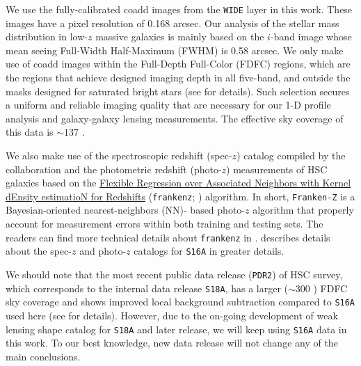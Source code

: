 \documentclass[fleqn,usenatbib,useAMS,english]{mnras}
\begin{document}
    We use the fully-calibrated coadd images from the \texttt{WIDE} layer in this work.
    These images have a pixel resolution of 0.168 arcsec.
    Our analysis of the stellar mass distribution in low-$z$ massive galaxies is mainly based on
    the $i$-band image whose mean seeing Full-Width Half-Maximum (FWHM) is 0.58 arcsec.
    We only make use of coadd images within the Full-Depth Full-Color (FDFC) regions, which
    are the regions that achieve designed imaging depth in all five-band, and outside the masks
    designed for saturated bright stars (see \citealt{HSC-STAR} for details).
    Such selection secures a uniform and reliable imaging quality that are necessary for
    our 1-D profile analysis and galaxy-galaxy lensing measurements.
    The effective sky coverage of this data is $\sim 137$ \sqdeg{}.

    We also make use of the spectroscopic redshift (spec-$z$) catalog compiled by the collaboration
    and the photometric redshift (photo-$z$) measurements of HSC galaxies based on the
    \href{https://github.com/joshspeagle/frankenz}{Flexible Regression over Associated Neighbors
    with Kernel dEnsity estimatioN for Redshifts} (\texttt{frankenz}; \citealt{Speagle2019})
    algorithm.
    In short, \texttt{Franken-Z} is a Bayesian-oriented nearest-neighbors (NN)- based photo-$z$
    algorithm that properly account for measurement errors within both training and testing sets.
    The readers can find more technical details about \texttt{frankenz} in \citet{Speagle2019}.
    \citet{HSC-PHOTOZ} describes details about the spec-$z$ and photo-$z$ catalogs for \texttt{S16A}
    in greater details.

    We should note that the most recent public data release (\texttt{PDR2}) of HSC survey, which
    corresponds to the internal data release \texttt{S18A}, has a larger ($\sim 300$ \sqdeg{}) FDFC
    sky coverage and shows improved local background subtraction compared to \texttt{S16A} used here
    (see \citealt{HSC-DR2} for details).
    However, due to the on-going development of weak lensing shape catalog for \texttt{S18A} and
    later release, we will keep using \texttt{S16A} data in this work.
    To our best knowledge, new data release will not change any of the main conclusions.

\end{document}
